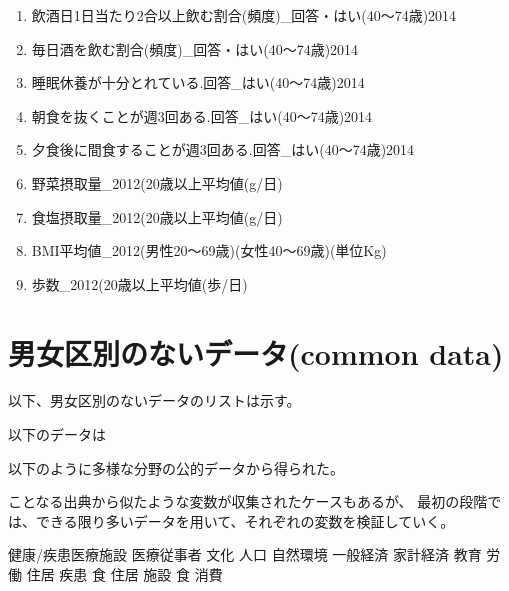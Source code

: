 \begin{multicols}{2}
\begin{enumerate}
  \item 飲酒日1日当たり2合以上飲む割合(頻度)\_回答・はい(40〜74歳)2014
  \item 毎日酒を飲む割合(頻度)\_回答・はい(40〜74歳)2014
  \item 睡眠休養が十分とれている.回答\_はい(40〜74歳)2014
  \item 朝食を抜くことが週3回ある.回答\_はい(40〜74歳)2014
  \item 夕食後に間食することが週3回ある.回答\_はい(40〜74歳)2014
  \item 野菜摂取量\_2012(20歳以上平均値(g/日)
  \item 食塩摂取量\_2012(20歳以上平均値(g/日)
  \item BMI平均値\_2012(男性20〜69歳)(女性40〜69歳)(単位Kg)
  \item 歩数\_2012(20歳以上平均値(歩/日)
\end{enumerate}


\end{multicols}




\newpage

\section{男女区別のないデータ(common data)}





以下、男女区別のないデータのリストは示す。

以下のデータは


以下のように多様な分野の公的データから得られた。

ことなる出典から似たような変数が収集されたケースもあるが、
最初の段階では、できる限り多いデータを用いて、それぞれの変数を検証していく。



健康/疾患医療施設
医療従事者
文化
人口
自然環境
一般経済
家計経済
教育
労働
住居
疾患
食
住居
施設
食
消費









